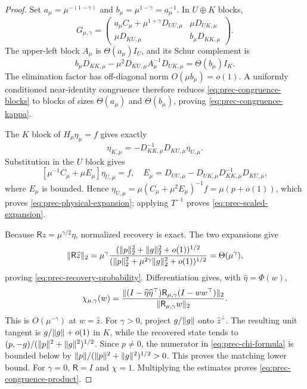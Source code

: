 \begin{proof}
Set $a_\mu=\mu^{-(1-\gamma)}$ and
$b_\mu=\mu^{1-\gamma}=a_\mu^{-1}$.  In $U\oplus K$ blocks,
\begin{equation}
 G_{\mu,\gamma}=
 \begin{pmatrix}
 a_\mu C_\mu+\mu^{1+\gamma}D_{UU,\mu}&\mu D_{UK,\mu}\\
 \mu D_{KU,\mu}&b_\mu D_{KK,\mu}
 \end{pmatrix}.                                         \label{eq:prec-congruence-blocks}
\end{equation}
The upper-left block $A_\mu$ is $\Theta(a_\mu)I_U$, and its Schur
complement is
\[
 b_\mu D_{KK,\mu}-\mu^2D_{KU,\mu}A_\mu^{-1}D_{UK,\mu}
 =\Theta(b_\mu)I_K.
\]
The elimination factor has off-diagonal norm
$O(\mu b_\mu)=o(1)$.  A uniformly conditioned near-identity congruence
therefore reduces \eqref{eq:prec-congruence-blocks} to blocks of sizes
$\Theta(a_\mu)$ and $\Theta(b_\mu)$, proving
\eqref{eq:prec-congruence-kappa}.

The $K$ block of $H_\mu\eta_\mu=f$ gives exactly
\[
 \eta_{K,\mu}=-D_{KK,\mu}^{-1}D_{KU,\mu}\eta_{U,\mu}.
\]
Substitution in the $U$ block gives
\[
 [\mu^{-1}C_\mu+\mu E_\mu]\eta_{U,\mu}=f,
 \quad
 E_\mu=D_{UU,\mu}-D_{UK,\mu}D_{KK,\mu}^{-1}D_{KU,\mu},
\]
where $E_\mu$ is bounded.  Hence
$\eta_{U,\mu}=\mu(C_\mu+\mu^2E_\mu)^{-1}f=\mu(p+o(1))$,
which proves \eqref{eq:prec-physical-expansion}; applying $T^{-1}$ proves
\eqref{eq:prec-scaled-expansion}.

Because $\mathsf Rz=\mu^{\gamma/2}\eta$, normalized recovery is exact.
The two expansions give
\[
 \lVert\mathsf R\widehat z\rVert_2
 =\mu^\gamma
 \frac{(\lVert p\rVert_2^2+\lVert g\rVert_2^2+o(1))^{1/2}}
      {(\lVert p\rVert_2^2+\mu^{2\gamma}\lVert g\rVert_2^2+o(1))^{1/2}}
 =\Theta(\mu^\gamma),
\]
proving \eqref{eq:prec-recovery-probability}.  Differentiation gives, with
$\widehat\eta=\Phi(w)$,
\begin{equation}
 \chi_{\mu,\gamma}(w)=
 \frac{\lVert(I-\widehat\eta\widehat\eta^\top)
 \mathsf R_{\mu,\gamma}(I-ww^\top)\rVert_2}
      {\lVert\mathsf R_{\mu,\gamma}w\rVert_2}.                \label{eq:prec-chi-formula}
\end{equation}
This is $O(\mu^{-\gamma})$ at $w=\widehat z$.  For $\gamma>0$, project
$g/\lVert g\rVert$ onto $\widehat z^\perp$.  The resulting unit tangent is
$g/\lVert g\rVert+o(1)$ in $K$, while the recovered state tends to
$(p,-g)/(\lVert p\rVert^2+\lVert g\rVert^2)^{1/2}$.  Since $p\ne0$, the numerator in
\eqref{eq:prec-chi-formula} is bounded below by
$\lVert p\rVert/(\lVert p\rVert^2+\lVert g\rVert^2)^{1/2}>0$.  This proves the matching lower
bound.  For $\gamma=0$, $\mathsf R=I$ and $\chi=1$.  Multiplying the
estimates proves \eqref{eq:prec-congruence-product}.
\end{proof}

